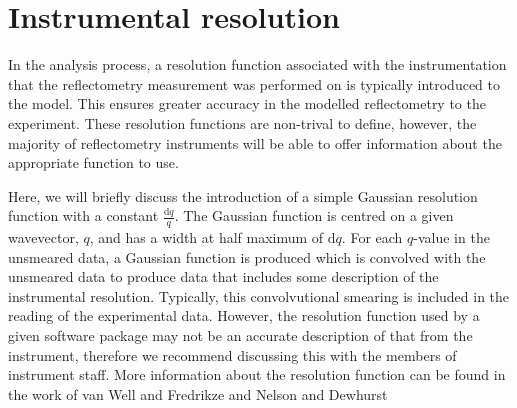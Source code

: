 \documentclass[
 reprint,
 superscriptaddress,
 amsmath,amssymb,
 aps,
]{revtex4-1}
\begin{document}
\section{Instrumental resolution}
In the analysis process, a resolution function associated with the instrumentation that the reflectometry measurement was performed on is typically introduced to the model. 
This ensures greater accuracy in the modelled reflectometry to the experiment.
These resolution functions are non-trival to define, however, the majority of reflectometry instruments will be able to offer information about the appropriate function to use.

Here, we will briefly discuss the introduction of a simple Gaussian resolution function with a constant $\frac{\text{d}q}{q}$.
The Gaussian function is centred on a given wavevector, $q$, and has a width at half maximum of $\text{d}q$.
For each $q$-value in the unsmeared data, a Gaussian function is produced which is convolved with the unsmeared data to produce data that includes some description of the instrumental resolution.
Typically, this convolvutional smearing is included in the reading of the experimental data.
However, the resolution function used by a given software package may not be an accurate description of that from the instrument, therefore we recommend discussing this with the members of instrument staff.
More information about the resolution function can be found in the work of van Well and Fredrikze \cite{vanwell_resolution_2005} and Nelson and Dewhurst \cite{nelson_towards_2013,nelson_towards_2014}
\end{document}

